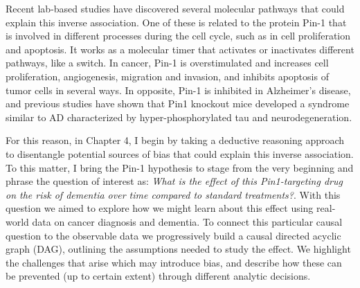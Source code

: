 \documentclass[
]{book}
\begin{document}
Recent lab-based studies have discovered several molecular pathways that could explain this inverse association. One of these is related to the protein Pin-1 that is involved in different processes during the cell cycle, such as in cell proliferation and apoptosis. It works as a molecular timer that activates or inactivates different pathways, like a switch. In cancer, Pin-1 is overstimulated and increases cell proliferation, angiogenesis, migration and invasion, and inhibits apoptosis of tumor cells in several ways. In opposite, Pin-1 is inhibited in Alzheimer's disease, and previous studies have shown that Pin1 knockout mice developed a syndrome similar to AD characterized by hyper-phosphorylated tau and neurodegeneration\autocite{lin2020,drivepin2015,driverbiogeront2014,liou2003}.

For this reason, in Chapter 4, I begin by taking a deductive reasoning approach to disentangle potential sources of bias that could explain this inverse association. To this matter, I bring the Pin-1 hypothesis to stage from the very beginning and phrase the question of interest as: \emph{What is the effect of this Pin1-targeting drug on the risk of dementia over time compared to standard treatments?}. With this question we aimed to explore how we might learn about this effect using real-world data on cancer diagnosis and dementia. To connect this particular causal question to the observable data we progressively build a causal directed acyclic graph (DAG), outlining the assumptions needed to study the effect. We highlight the challenges that arise which may introduce bias, and describe how these can be prevented (up to certain extent) through different analytic decisions.
\end{document}
